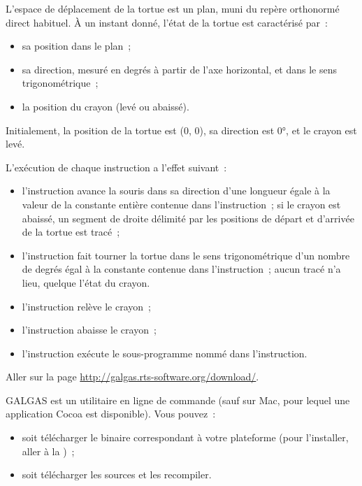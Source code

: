 
L'espace de déplacement de la tortue est un plan, muni du repère orthonormé direct habituel. À un instant donné, l'état de la tortue est caractérisé par~:
\begin{itemize}
  \item sa position dans le plan~;
  \item sa direction, mesuré en degrés à partir de l'axe horizontal, et dans le sens trigonométrique~;
  \item la position du crayon (levé ou abaissé).
\end{itemize}

Initialement, la position de la tortue est (0, 0), sa direction est 0°, et le crayon est levé.

L'exécution de chaque instruction a l'effet suivant~:
\begin{itemize}
  \item l'instruction  avance la souris dans sa direction d'une longueur égale à la valeur de la constante entière contenue dans l'instruction~; si le crayon est abaissé, un segment de droite délimité par les positions de départ et d'arrivée de la tortue est tracé~;
  \item l'instruction  fait tourner la tortue dans le sens trigonométrique d'un nombre de degrés égal à la constante contenue dans l'instruction~; aucun tracé n'a lieu, quelque l'état du crayon.
  \item l'instruction  relève le crayon~;
  \item l'instruction  abaisse le crayon~;
  \item l'instruction  exécute le sous-programme nommé dans l'instruction.
\end{itemize}












Aller sur la page \url{http://galgas.rts-software.org/download/}.

GALGAS est un utilitaire en ligne de commande (sauf sur Mac, pour lequel une application Cocoa est disponible). Vous pouvez~:
\begin{itemize}
  \item soit télécharger le binaire correspondant à votre plateforme (pour l'installer, aller à la )~;
  \item soit télécharger les sources et les recompiler.
\end{itemize}




